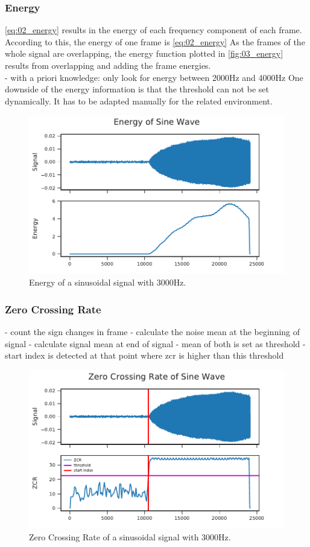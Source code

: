 \subsubsection*{Energy}

\ref{eq:02_energy} results in the energy of each frequency component of each frame.
According to this, the energy of one frame is \ref{eq:02_energy}
As the frames of the whole signal are overlapping, the energy function plotted in
\ref{fig:03_energy} results from overlapping and adding the frame energies.\\
- with a priori knowledge: only look for energy between 2000Hz and 4000Hz
One downside of the energy information is that the threshold can not be
set dynamically. It has to be adapted manually for the related environment.

\begin{figure}[ht]
	\centering
		\includegraphics[]{figures/sine_energy}
	\caption{Energy of a sinusoidal signal with 3000Hz.}
\end{figure}
\label{fig:03_energy}

\subsubsection*{Zero Crossing Rate}

- count the sign changes in frame
- calculate the noise mean at the beginning of signal
- calculate signal mean at end of signal
- mean of both is set as threshold
- start index is detected at that point where zcr is higher than this threshold

\begin{figure}[ht]
	\centering
		\includegraphics[]{figures/sine_zcr}
	\caption{Zero Crossing Rate of a sinusoidal signal with 3000Hz.}
\end{figure}
\label{fig:03_zcr}